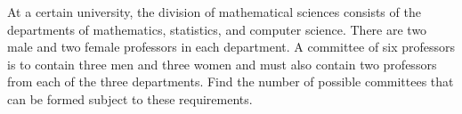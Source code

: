 At a certain university, the division of mathematical sciences consists of the departments of mathematics, statistics, and computer science. There are two male and two female professors in each department. A committee of six professors is to contain three men and three women and must also contain two professors from each of the three departments. Find the number of possible committees that can be formed subject to these requirements.
